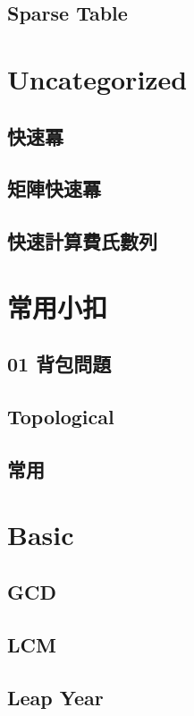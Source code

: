     \subsection{Sparse Table}
        


\section{Uncategorized}
    \subsection{快速冪}
        
    \subsection{矩陣快速冪}
        
    \subsection{快速計算費氏數列}
        


\section{常用小扣}
    \subsection{01 背包問題}
        
    \subsection{Topological}
        
    \subsection{常用}
        


\section{Basic}
    \subsection{GCD}
        
    \subsection{LCM}
        
    \subsection{Leap Year}
        